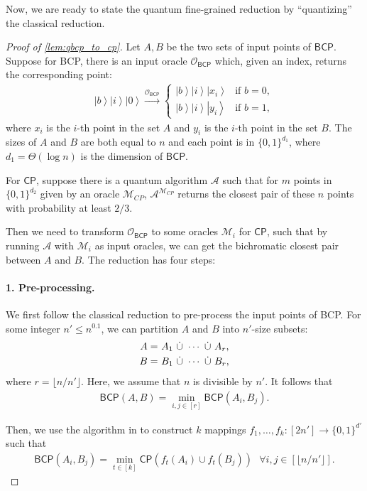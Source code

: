 \documentclass[10pt,a4paper]{article}
\newcommand{\ket}[1]{\left| #1 \right\rangle}
\newcommand{\ora}{\mathcal{O}}
\newcommand{\CP}{\ensuremath{\mathsf{CP}}}
\newcommand{\BCP}{\ensuremath{\mathsf{BCP}}}
\begin{document}
Now, we are ready to state the quantum fine-grained reduction by ``quantizing'' the classical reduction.
\begin{proof}[Proof of \cref{lem:qbcp_to_cp}]
Let $A,B$ be the two sets of input points of $\textsf{BCP}$. Suppose for \textsf{BCP}, there is an input oracle $\ora_{\BCP}$ which, given an index, returns the corresponding point:
\begin{align}
    \ket{b}\ket{i}\ket{0} \xrightarrow{\ora_{\BCP}}
    \begin{cases}
        \ket{b}\ket{i}\ket{x_i} &\text{if } b= 0,\\
        \ket{b}\ket{i}\ket{y_i} & \text{if } b= 1,
    \end{cases}
\end{align}
where $x_i$ is the $i$-th point in the set $A$ and $y_i$ is the $i$-th point in the set $B$. The sizes of $A$ and $B$ are both equal to $n$ and each point is in $\{0,1\}^{d_1}$, where $d_1=\Theta(\log n)$ is the dimension of $\BCP$. 
 
For $\CP$, suppose there is a quantum algorithm $\mathcal{A}$ such that for $m$ points in $\{0,1\}^{d_2}$ given by an oracle $\mathcal{M}_{CP}$, $\mathcal{A}^{\mathcal{M}_{CP}}$ returns the closest pair of these $n$ points with probability at least $2/3$.

Then we need to transform $\ora_{\BCP}$ to some oracles $\mathcal{M}_i$ for \CP, such that by running $\mathcal{A}$ with $\mathcal{M}_i$ as input oracles, we can get the bichromatic closest pair between $A$ and $B$. The reduction has four steps:

\paragraph*{1. Pre-processing.} We first follow the classical reduction to pre-process the input points of \textsf{BCP}. For some integer $n'\leq n^{0.1}$, we can partition $A$ and $B$ into $n'$-size subsets:
\begin{align}
    A= &~ A_1~\dot\cup ~\cdots ~\dot \cup~ A_{r},\\
    B= &~ B_1 ~\dot\cup ~\cdots ~\dot \cup~ B_{r},\notag
\end{align}
where $r=\lfloor n/n'\rfloor$. Here, we assume that $n$ is divisible by $n'$. It follows that
\begin{align}\label{eq:bcp_bcp}
    \textsf{BCP}(A,B)=\min_{i,j\in [r]} \textsf{BCP}(A_i,B_j).
\end{align}

Then, we use the algorithm in \cite{r29} to construct $k$ mappings $f_1,\dots, f_k:[2n']\rightarrow \{0,1\}^{d'}$ such that 
\begin{align}\label{eq:bcp_cp}
    \textsf{BCP}(A_i,B_j)=\min_{t\in [k]} \textsf{CP}(f_t(A_i)\cup f_t(B_j)) ~~~ \forall i,j\in [\lfloor n/n'\rfloor].
\end{align}


\end{proof}
\end{document}
